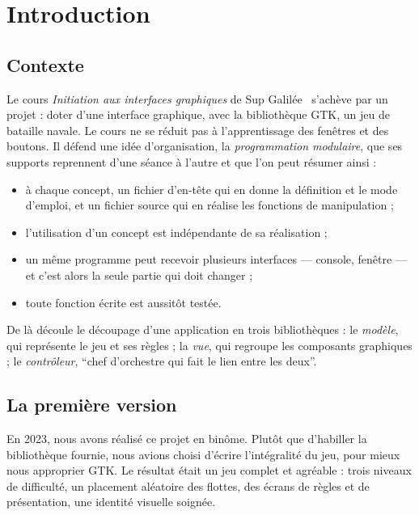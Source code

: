 \chapter{Introduction}
\label{chap-introduction}

\section{Contexte}

Le cours \emph{Initiation aux interfaces graphiques} de Sup Galilée~\cite{toulouse2023}
s'achève par un projet : doter d'une interface graphique, avec la bibliothèque GTK, un jeu
de bataille navale. Le cours ne se réduit pas à l'apprentissage des fenêtres et des boutons.
Il défend une idée d'organisation, la \emph{programmation modulaire}, que ses supports
reprennent d'une séance à l'autre et que l'on peut résumer ainsi :

\begin{itemize}
    \item à chaque concept, un fichier d'en-tête qui en donne la définition et le mode
          d'emploi, et un fichier source qui en réalise les fonctions de manipulation ;
    \item l'utilisation d'un concept est indépendante de sa réalisation ;
    \item un même programme peut recevoir plusieurs interfaces --- console, fenêtre --- et
          c'est alors la seule partie qui doit changer ;
    \item toute fonction écrite est aussitôt testée.
\end{itemize}

De là découle le découpage d'une application en trois bibliothèques : le \emph{modèle}, qui
représente le jeu et ses règles ; la \emph{vue}, qui regroupe les composants graphiques ;
le \emph{contrôleur}, \enquote{chef d'orchestre qui fait le lien entre les deux}.

\section{La première version}

En 2023, nous avons réalisé ce projet en binôme. Plutôt que d'habiller la bibliothèque
fournie, nous avions choisi d'écrire l'intégralité du jeu, pour mieux nous approprier GTK.
Le résultat était un jeu complet et agréable : trois niveaux de difficulté, un placement
aléatoire des flottes, des écrans de règles et de présentation, une identité visuelle
soignée.

